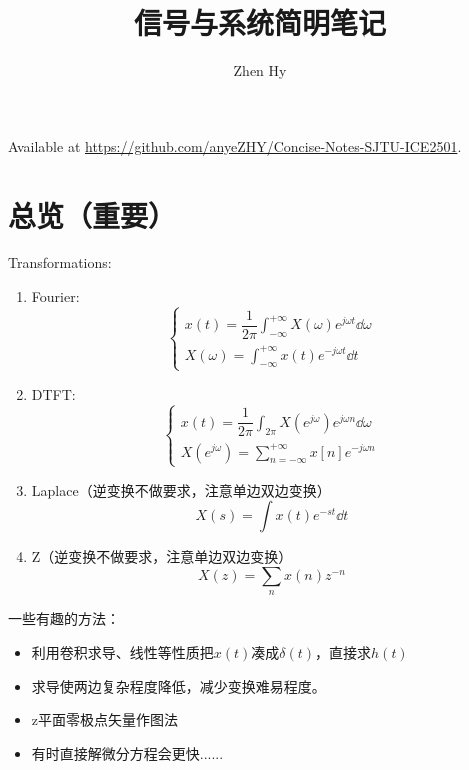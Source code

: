 \documentclass{article}
\def\suminf#1{\sum_{#1=-\infty}^{+\infty}}
\begin{document}
\title{信号与系统简明笔记}
\author{Zhen Hy}
\maketitle
Available at \textcolor{blue}{\url{https://github.com/anyeZHY/Concise-Notes-SJTU-ICE2501}}.
\section*{\centering \color{Purple}总览（重要）}

\begin{thm}Transformations:
	\begin{enumerate}
		\item Fourier:
			\[
				\begin{cases}\displaystyle
					x(t)=\dfrac{1}{2\pi}\int_{-\infty}^{+\infty} X(\omega)e^{j\omega t}\dd\omega
					\\[10pt]\displaystyle
					X(\omega)=
					\int_{-\infty}^{+\infty} x(t)e^{-j\omega t}\dd t
				\end{cases}
			\]
		\item DTFT:
			\[
				\begin{cases}\displaystyle
					x(t)=\dfrac{1}{2\pi}
					\int_{2\pi}
					X(e^{j\omega})e^{j\omega n}\dd \omega
					\\[10pt]\displaystyle
					X(e^{j\omega})=
					\suminf{n}x[n]e^{-j\omega n}
				\end{cases}
			\]
		\item Laplace（逆变换不做要求，注意单边双边变换）
			\[
				X(s)=\int x(t)e^{-st}\dd t
			\]
		\item Z（逆变换不做要求，注意单边双边变换）
			\[
				X(z)=\sum_nx(n)z^{-n}
			\] 
	\end{enumerate}
\end{thm}


\begin{mdframed}
	{\color{Purple}一些有趣的方法：}
	\begin{itemize}
		\item 利用卷积求导、线性等性质把$x(t)$凑成$\delta(t)$，直接求$h(t)$
		\item 求导使两边复杂程度降低，减少变换难易程度。
		\item z平面零极点矢量作图法
		\item 有时直接解微分方程会更快......
	\end{itemize}
\end{mdframed}
\end{document}
